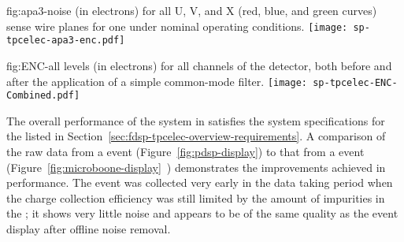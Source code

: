 
\begin{dunefigure}
{fig:apa3-noise}
{ (in electrons) for all U, V, and X (red, blue, and green curves) sense 
wire planes for one   %
under nominal operating 
conditions.}
\texttt{[image: sp-tpcelec-apa3-enc.pdf]}
\end{dunefigure}

\begin{dunefigure}
{fig:ENC-all}
{ levels (in electrons) for all channels of the  detector, both
before and after the application of a simple common-mode filter.}
\texttt{[image: sp-tpcelec-ENC-Combined.pdf]}
\end{dunefigure}

The overall performance of the  system in 
 satisfies the %
 system specifications %
for the  %
listed in Section~\ref{sec:fdsp-tpcelec-overview-requirements}. 
%
A comparison of the raw data from 
a  event (Figure~\ref{fig:pdsp-display}) to 
that from a  event (Figure~\ref{fig:microboone-display}~\cite{Acciarri:2017sde}) demonstrates the improvements achieved in  performance. 
The  event was collected very early in the data taking
period when the charge collection efficiency was still limited
by the amount of impurities in the ; it shows very little
noise and appears to be of the same quality as the 
event display after offline noise removal. 


